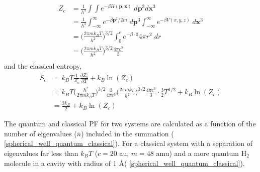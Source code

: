 \documentclass[../main.tex]{subfiles}
\begin{document}
\begin{equation}
\begin{aligned}
Z_c &= \frac{1}{h^{3}}\int\int e^{-\beta H(\boldsymbol{p}, \boldsymbol{x})} \; d\boldsymbol{p}^{3} d\boldsymbol{x}^{3} \\
&= \frac{1}{h^{3}}\int_{-\infty}^\infty e^{-\beta \boldsymbol{p}^2/2m} \; d\boldsymbol{p}^{3} \int_{-\infty}^\infty e^{-\beta V(x, y, z)} \;  d\boldsymbol{x}^{3} \\
&= {\Big (} \frac{2\pi m k_B T}{h^2} {\Big )}^{3/2}  \int_0^c e^{-\beta \cdot 0}  4\pi r^2\;  dr \\
&= {\Big (} \frac{2\pi m k_B T}{h^2} {\Big )}^{3/2} \frac{4\pi c^3}{3} \\
\end{aligned}
\end{equation}
and the classical entropy,
\begin{equation}
\begin{aligned}
S_c &= k_B T \frac{1}{Z_c} \frac{\partial Z_c}{\partial T} + k_B \ln(Z_c) \\
&= k_B T {\Big (} \frac{h^2}{2\pi m k_B T} {\Big )}^{3/2} \frac{3}{4\pi c^3} {\Big (} \frac{2\pi m k_B}{h^2} {\Big )}^{3/2} \frac{4\pi c^3}{3}\cdot \frac{3}{2}T^{1/2} + k_B \ln(Z_c) \\
&= \frac{3k_B}{2} + k_B \ln(Z_c)
\end{aligned}
\end{equation}

The quantum and classical PF for two systems are calculated as a function of the number of eigenvalues ($\bar{n}$) included in the summation (\figurename{ \ref{spherical_well_quantum_classical}}). For a classical system with a separation of eigenvalues far less than $k_BT$ ($c = 20$ au, $m = 48$ amu) and a more quantum H$_2$ molecule in a cavity with radius of 1 \AA (\figurename{ \ref{spherical_well_quantum_classical}}).
\end{document}
